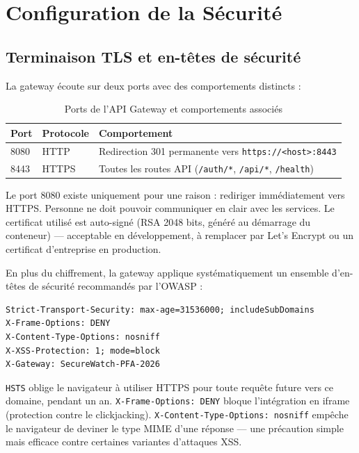 \documentclass[12pt, a4paper]{report}
\begin{document}
\section{Configuration de la Sécurité}

\subsection{Terminaison TLS et en-têtes de sécurité}

La gateway écoute sur deux ports avec des comportements distincts :

\begin{table}[H]
  \centering
  \caption{Ports de l'API Gateway et comportements associés}
  \begin{tabular}{@{}lll@{}}
    \toprule
    \textbf{Port} & \textbf{Protocole} & \textbf{Comportement} \\
    \midrule
    8080 & HTTP  & Redirection 301 permanente vers \texttt{https://<host>:8443} \\
    8443 & HTTPS & Toutes les routes API (\texttt{/auth/*}, \texttt{/api/*}, \texttt{/health}) \\
    \bottomrule
  \end{tabular}
\end{table}

\medskip
Le port 8080 existe uniquement pour une raison : rediriger immédiatement vers HTTPS. Personne ne doit pouvoir communiquer en clair avec les services. Le certificat utilisé est auto-signé (RSA 2048 bits, généré au démarrage du conteneur) — acceptable en développement, à remplacer par Let's Encrypt ou un certificat d'entreprise en production.

En plus du chiffrement, la gateway applique systématiquement un ensemble d'en-têtes de sécurité recommandés par l'OWASP :

\begin{lstlisting}[style=bash, caption={En-têtes de sécurité HTTP appliqués par la gateway}]
Strict-Transport-Security: max-age=31536000; includeSubDomains
X-Frame-Options: DENY
X-Content-Type-Options: nosniff
X-XSS-Protection: 1; mode=block
X-Gateway: SecureWatch-PFA-2026
\end{lstlisting}

\texttt{HSTS} oblige le navigateur à utiliser HTTPS pour toute requête future vers ce domaine, pendant un an. \texttt{X-Frame-Options: DENY} bloque l'intégration en iframe (protection contre le clickjacking). \texttt{X-Content-Type-Options: nosniff} empêche le navigateur de deviner le type MIME d'une réponse — une précaution simple mais efficace contre certaines variantes d'attaques XSS.
\end{document}
